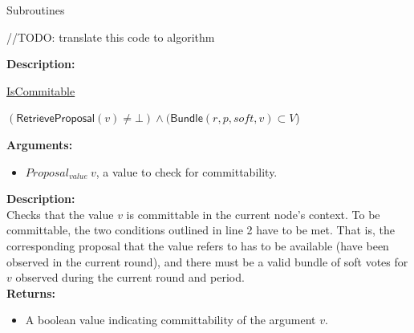 \documentclass[10pt,a4paper]{article}
\begin{document}
\begin{section}{Subroutines}
\begin{algorithm}[H]
\begin{algorithmic}[1]
    //TODO: translate this code to algorithm
    \EndIf







    \EndFunction
    \end{algorithmic}
\end{algorithm}

\noindent \textbf{Description:}\\


\begin{algorithm}[H]
    \caption{\underline{IsCommitable}}
    \label{algo:is-commitable}
    \begin{algorithmic}[1]

    \State \Return $(\mathsf{RetrieveProposal}(v) \neq \bot) \land (\mathsf{Bundle}(r,p,soft,v) \subset V$)

    \EndFunction
    \end{algorithmic}
\end{algorithm}


\noindent \textbf{Arguments:}
\begin{itemize}
    \item $Proposal_{value} \ v$, a value to check for committability.
  \end{itemize}

\noindent \textbf{Description:}\\
Checks that the value $v$ is committable in the current node's context.
To be committable, the two conditions outlined in line 2 have to be met.
That is, the corresponding proposal that the value refers to has to be
available (have been observed in the current round), and there must
be a valid bundle of soft votes for $v$ observed during the current round and
period. \\

\noindent \textbf{Returns:}
\begin{itemize}
    \item A boolean value indicating committability of the argument $v$.
  \end{itemize}


\end{section}
\end{document}
